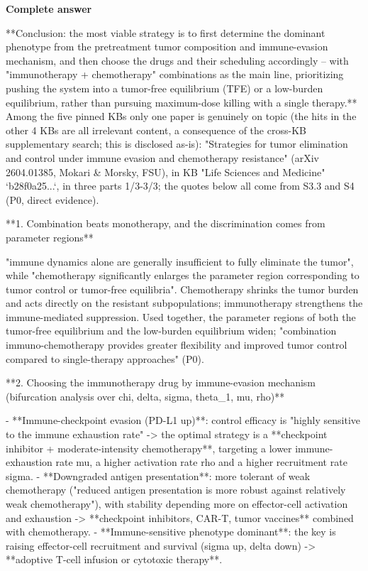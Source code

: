 \documentclass[10pt]{article}
\begin{document}
\textbf{Complete answer}
\begin{AnswerText}
**Conclusion: the most viable strategy is to first determine the dominant phenotype from the pretreatment tumor composition and immune-evasion mechanism, and then choose the drugs and their scheduling accordingly -- with "immunotherapy + chemotherapy" combinations as the main line, prioritizing pushing the system into a tumor-free equilibrium (TFE) or a low-burden equilibrium, rather than pursuing maximum-dose killing with a single therapy.** Among the five pinned KBs only one paper is genuinely on topic (the hits in the other 4 KBs are all irrelevant content, a consequence of the cross-KB supplementary search; this is disclosed as-is): "Strategies for tumor elimination and control under immune evasion and chemotherapy resistance" (arXiv 2604.01385, Mokari & Morsky, FSU), in KB "Life Sciences and Medicine" `b28f0a25...`, in three parts 1/3-3/3; the quotes below all come from S3.3 and S4 (P0, direct evidence).

**1. Combination beats monotherapy, and the discrimination comes from parameter regions**

"immune dynamics alone are generally insufficient to fully eliminate the tumor", while "chemotherapy significantly enlarges the parameter region corresponding to tumor control or tumor-free equilibria". Chemotherapy shrinks the tumor burden and acts directly on the resistant subpopulations; immunotherapy strengthens the immune-mediated suppression. Used together, the parameter regions of both the tumor-free equilibrium and the low-burden equilibrium widen; "combination immuno-chemotherapy provides greater flexibility and improved tumor control compared to single-therapy approaches" (P0).

**2. Choosing the immunotherapy drug by immune-evasion mechanism (bifurcation analysis over chi, delta, sigma, theta_1, mu, rho)**

- **Immune-checkpoint evasion (PD-L1 up)**: control efficacy is "highly sensitive to the immune exhaustion rate" -> the optimal strategy is a **checkpoint inhibitor + moderate-intensity chemotherapy**, targeting a lower immune-exhaustion rate mu, a higher activation rate rho and a higher recruitment rate sigma.
- **Downgraded antigen presentation**: more tolerant of weak chemotherapy ("reduced antigen presentation is more robust against relatively weak chemotherapy"), with stability depending more on effector-cell activation and exhaustion -> **checkpoint inhibitors, CAR-T, tumor vaccines** combined with chemotherapy.
- **Immune-sensitive phenotype dominant**: the key is raising effector-cell recruitment and survival (sigma up, delta down) -> **adoptive T-cell infusion or cytotoxic therapy**.


\end{AnswerText}
\end{document}
